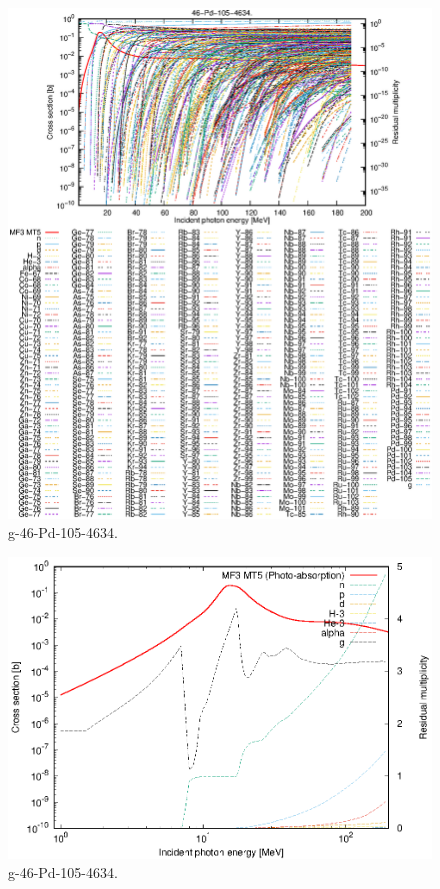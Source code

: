 \begin{figure}
 \includegraphics[width=\linewidth]{eps/g_46-Pd-105_4634.eps}
  \caption{g-46-Pd-105-4634.}
\end{figure}
\newpage \clearpage

\begin{figure}
 \includegraphics[width=\linewidth]{eps-log/g_46-Pd-105_4634.eps}
 \caption{g-46-Pd-105-4634.}
\end{figure}
\newpage \clearpage

